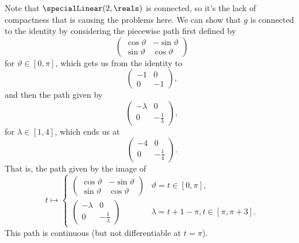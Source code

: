 \documentclass[fleqn]{NotesClass}
\begin{document}
    Note that \(\specialLinear(2, \reals)\) is connected, so it's the lack of compactness that is causing the problems here.
    We can show that \(g\) is connected to the identity by considering the piecewise path first defined by
    \begin{equation}
        \begin{pmatrix}
            \cos\vartheta & -\sin\vartheta\\
            \sin\vartheta & \cos\vartheta
        \end{pmatrix}
    \end{equation}
    for \(\vartheta \in [0, \pi]\), which gets us from the identity to
    \begin{equation}
        \begin{pmatrix}
            -1 & 0\\
            0 & -1
        \end{pmatrix}
        ,
    \end{equation}
    and then the path given by
    \begin{equation}
        \begin{pmatrix}
            -\lambda & 0\\ 0 & -\frac{1}{\lambda}
        \end{pmatrix}
        ,
    \end{equation}
    for \(\lambda \in [1, 4]\), which ends us at
    \begin{equation}
        \begin{pmatrix}
            -4 & 0\\
            0 & -\frac{1}{4}
        \end{pmatrix}
        .
    \end{equation}
    That is, the path given by the image of
    \begin{equation}
        t \mapsto
        \begin{cases}
            \begin{pmatrix}
                \cos\vartheta & -\sin\vartheta\\
                \sin\vartheta & \cos\vartheta
            \end{pmatrix}
            & \vartheta = t \in [0, \pi],\\
            \begin{pmatrix}
                -\lambda & 0\\
                0 & -\frac{1}{\lambda}
            \end{pmatrix}
            & \lambda = t + 1 - \pi, t \in [\pi, \pi + 3].
        \end{cases}
    \end{equation}
    This path is continuous (but not differentiable at \(t = \pi\)).
    
\end{document}
